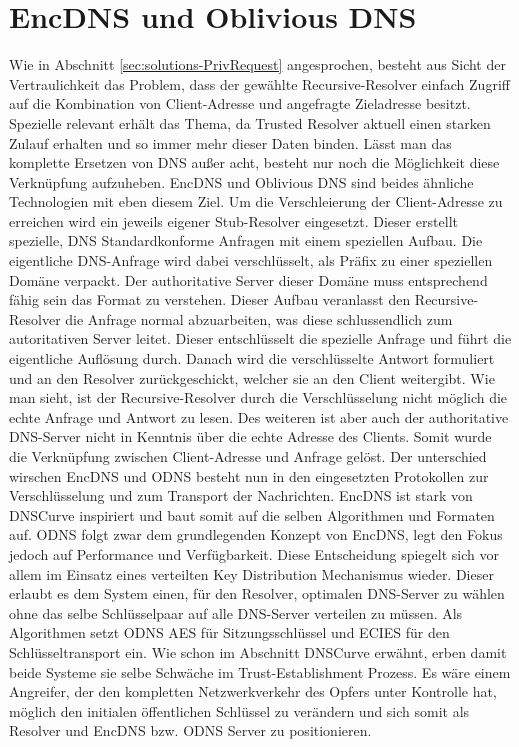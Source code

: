 \section{EncDNS und Oblivious DNS}

Wie in Abschnitt \ref{sec:solutions-PrivRequest} angesprochen, besteht aus Sicht der Vertraulichkeit das Problem, dass der gewählte Recursive-Resolver einfach Zugriff auf die Kombination von Client-Adresse und angefragte Zieladresse besitzt. Spezielle relevant erhält das Thema, da Trusted Resolver aktuell einen starken Zulauf erhalten und so immer mehr dieser Daten binden. Lässt man das komplette Ersetzen von DNS außer acht, besteht nur noch die Möglichkeit diese Verknüpfung aufzuheben. 
EncDNS\cite{Herrmann2014} und Oblivious DNS\cite{Schmitt2018} sind beides ähnliche Technologien mit eben diesem Ziel. Um die Verschleierung der Client-Adresse zu erreichen wird ein jeweils eigener Stub-Resolver eingesetzt. Dieser erstellt spezielle, DNS Standardkonforme Anfragen mit einem speziellen Aufbau. Die eigentliche DNS-Anfrage wird dabei verschlüsselt, als Präfix zu einer speziellen Domäne verpackt. Der authoritative Server dieser Domäne muss entsprechend fähig sein das Format zu verstehen. Dieser Aufbau veranlasst den Recursive-Resolver die Anfrage normal abzuarbeiten, was diese schlussendlich zum autoritativen Server leitet. Dieser entschlüsselt die spezielle Anfrage und führt die eigentliche Auflösung durch. Danach wird die verschlüsselte Antwort formuliert und an den Resolver zurückgeschickt, welcher sie an den Client weitergibt.
Wie man sieht, ist der Recursive-Resolver durch die Verschlüsselung nicht möglich die echte Anfrage und Antwort zu lesen. Des weiteren ist aber auch der authoritative DNS-Server nicht in Kenntnis über die echte Adresse des Clients. Somit wurde die Verknüpfung zwischen Client-Adresse und Anfrage gelöst.
Der unterschied wirschen EncDNS und ODNS besteht nun in den eingesetzten Protokollen zur Verschlüsselung und zum Transport der Nachrichten. EncDNS ist stark von DNSCurve inspiriert und baut somit auf die selben Algorithmen und Formaten auf. ODNS folgt zwar dem grundlegenden Konzept von EncDNS, legt den Fokus jedoch auf Performance und Verfügbarkeit. Diese Entscheidung spiegelt sich vor allem im Einsatz eines verteilten Key Distribution Mechanismus wieder. Dieser erlaubt es dem System einen, für den Resolver, optimalen DNS-Server zu wählen ohne das selbe Schlüsselpaar auf alle DNS-Server verteilen zu müssen. Als Algorithmen setzt ODNS AES für Sitzungsschlüssel und ECIES für den Schlüsseltransport ein.
Wie schon im Abschnitt DNSCurve erwähnt, erben damit beide Systeme sie selbe Schwäche im Trust-Establishment Prozess. Es wäre einem Angreifer, der den kompletten Netzwerkverkehr des Opfers unter Kontrolle hat, möglich den initialen öffentlichen Schlüssel zu verändern und sich somit als Resolver und EncDNS bzw. ODNS Server zu positionieren.

